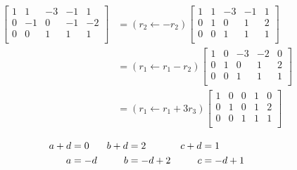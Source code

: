 \documentclass[
	date={August 26{,} 2024}
]{math486notes}
\begin{document}
\begin{example}
\begin{equation*}
\begin{aligned}
		\left[ \begin{array}{rrrr|r}
			1 & 1 & -3 & -1 & 1\\
			0 & -1 & 0 & -1 & -2\\
			0 & 0 & 1 & 1 & 1\\
		\end{array} \right]
		&= \left( r_{2} \gets -r_{2} \right) \left[ \begin{array}{rrrr|r}
			1 & 1 & -3 & -1 & 1\\
			0 & 1 & 0 & 1 & 2\\
			0 & 0 & 1 & 1 & 1\\
		\end{array} \right]\\
		&= \left( r_{1} \gets r_{1} - r_{2} \right) \left[ \begin{array}{rrrr|r}
			1 & 0 & -3 & -2 & 0\\
			0 & 1 & 0 & 1 & 2\\
			0 & 0 & 1 & 1 & 1\\
		\end{array} \right]\\
		&= \left( r_{1} \gets r_{1} + 3r_{3} \right) \left[ \begin{array}{rrrr|r}
			1 & 0 & 0 & 1 & 0\\
			0 & 1 & 0 & 1 & 2\\
			0 & 0 & 1 & 1 & 1\\
		\end{array} \right]\\
		\end{aligned}
	\end{equation*}
	\begin{equation*}
	\begin{aligned}
		a + d &= 0 { }{ } & { }{ } b + d &= 2 { }{ } & { }{ } c + d &= 1\\
		a &= -d { }{ } & { }{ } b &= -d + 2 { }{ } & { }{ } c &= -d + 1\\
	\end{aligned}
	\end{equation*}
\end{example}
\end{document}
